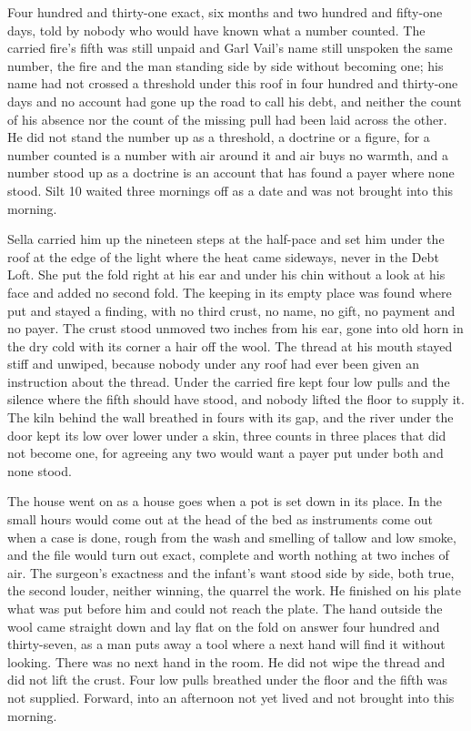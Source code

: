 Four hundred and thirty-one exact, six months and two hundred and fifty-one days, told by nobody who would have known what a number counted. The carried fire's fifth was still unpaid and Garl Vail's name still unspoken the same number, the fire and the man standing side by side without becoming one; his name had not crossed a threshold under this roof in four hundred and thirty-one days and no account had gone up the road to call his debt, and neither the count of his absence nor the count of the missing pull had been laid across the other. He did not stand the number up as a threshold, a doctrine or a figure, for a number counted is a number with air around it and air buys no warmth, and a number stood up as a doctrine is an account that has found a payer where none stood. Silt 10 waited three mornings off as a date and was not brought into this morning.

Sella carried him up the nineteen steps at the half-pace and set him under the roof at the edge of the light where the heat came sideways, never in the Debt Loft. She put the fold right at his ear and under his chin without a look at his face and added no second fold. The keeping in its empty place was found where put and stayed a finding, with no third crust, no name, no gift, no payment and no payer. The crust stood unmoved two inches from his ear, gone into old horn in the dry cold with its corner a hair off the wool. The thread at his mouth stayed stiff and unwiped, because nobody under any roof had ever been given an instruction about the thread. Under  the carried fire kept four low pulls and the silence where the fifth should have stood, and nobody lifted the floor to supply it. The kiln behind the wall breathed in fours with its gap, and the river under the door kept its low over lower under a skin, three counts in three places that did not become one, for agreeing any two would want a payer put under both and none stood.

The house went on as a house goes when a pot is set down in its place. In the small hours  would come out at the head of the bed as instruments come out when a case is done, rough from the wash and smelling of tallow and low smoke, and the file would turn out exact, complete and worth nothing at two inches of air. The surgeon's exactness and the infant's want stood side by side, both true, the second louder, neither winning, the quarrel the work. He finished on his plate what was put before him and could not reach the plate. The hand outside the wool came straight down and lay flat on the fold on answer four hundred and thirty-seven, as a man puts away a tool where a next hand will find it without looking. There was no next hand in the room. He did not wipe the thread and did not lift the crust. Four low pulls breathed under the floor and the fifth was not supplied. Forward, into an afternoon not yet lived and not brought into this morning.
